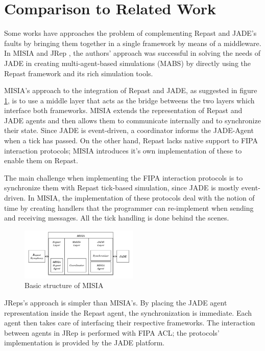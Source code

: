 \section{Comparison to Related Work} %
\label{sec:related_work}

Some works have approaches the problem of complementing Repast and JADE's faults by bringing them together in a single framework by means of a middleware. In MISIA \cite{garcia2011misia} and JRep \cite{gormer2011jrep}, the authors' approach was successful in solving the needs of JADE in creating multi-agent-based simulations (MABS) by directly using the Repast framework and its rich simulation tools.

MISIA's approach to the integration of Repast and JADE, as suggested in figure \ref{fig:misia}, is to use a middle layer that acts as the bridge betweens the two layers which interface both frameworks. MISIA extends the representation of Repast and JADE agents and then allows them to communicate internally and to synchronize their state. Since JADE is event-driven, a coordinator informs the JADE-Agent when a tick has passed. On the other hand, Repast lacks native support to FIPA interaction protocols; MISIA introduces it's own implementation of these to enable them on Repast.

The main challenge when implementing the FIPA interaction protocols is to synchronize them with Repast tick-based simulation, since JADE is mostly event-driven. In MISIA, the implementation of these protocols deal with the notion of time by creating handlers that the programmer can re-implement when sending and receiving messages. All the tick handling is done behind the scenes.

\begin{figure}[h]
	\centering
	\includegraphics[width=0.5\textwidth]{figures/MISIA.png}
	\caption{Basic structure of MISIA}
	\label{fig:misia}
\end{figure}

JReps's approach is simpler than MISIA's. By placing the JADE agent representation inside the Repast agent, the synchronization is immediate. Each agent then takes care of interfacing their respective frameworks. The interaction between agents in JRep is performed with FIPA ACL; the protocols' implementation is provided by the JADE platform.

